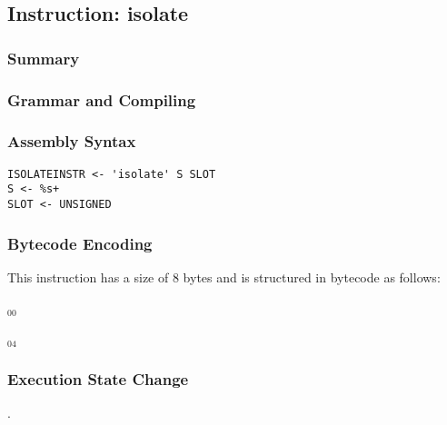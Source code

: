 \subsection{Instruction: isolate}

\subsubsection{Summary}


\subsubsection{Grammar and Compiling}


\subsubsection{Assembly Syntax}

\begin{myquote}
\begin{verbatim}
ISOLATEINSTR <- 'isolate' S SLOT
S <- %s+
SLOT <- UNSIGNED
\end{verbatim}
\end{myquote}


\subsubsection{Bytecode Encoding}

This instruction has a size of 8 bytes and is structured in bytecode as follows:

$_{00}$\ 



$_{04}$\ 


\subsubsection{Execution State Change}

.


